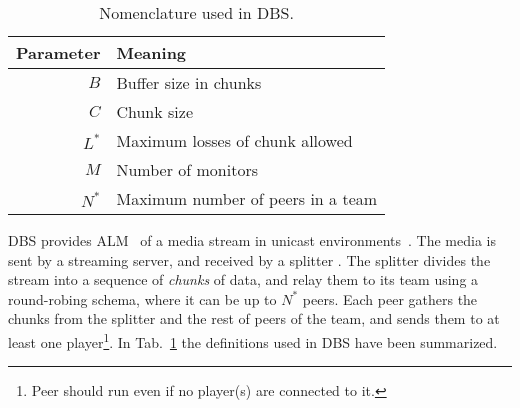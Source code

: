 
\label{sec:DBS}

\begin{table}
  \begin{tabular}{rl}
    Parameter & Meaning \\
    \hline
    $B$    & Buffer size in chunks \\
    $C$    & Chunk size \\
    $L^*$  & Maximum losses of chunk allowed \\
    $M$    & Number of monitors \\
    $N^*$  & Maximum number of peers in a team
  \end{tabular}
  \caption{Nomenclature used in DBS.\label{tab:DBS_nomenclature}}
\end{table}

DBS provides ALM~\cite{banerjee2002scalable} of a media stream in
unicast environments~\cite{comer2003computer}. The media is sent by a
streaming server, and received by a splitter . The splitter divides the stream into a
sequence of \emph{chunks} of data, and relay them to its team using a
round-robing schema, where it can be up to $N^*$ peers. Each peer
gathers the chunks from the splitter and the rest of peers of the
team, and sends them to at least one player\footnote{Peer should run
  even if no player(s) are connected to it.}. In
Tab.~\ref{tab:DBS_nomenclature} the definitions used in DBS have been
summarized.

\begin{comment}
In single layered streams\footnote{Each layer of a
  scalable stream is received by a different peer attached to the same
  player capable or render scalable media.}, each peer is spawned by a
player (normal users should not run peers directly).
\end{comment}

\begin{comment}
/* quitar: We define the set of teams as
$\{T\}$,
and enumerate the peers in the team $T$ as $T=\{P_1,\cdots,P_{|T|}\}$. */
\end{comment}
